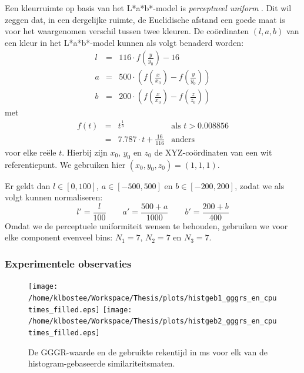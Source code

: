 Een kleurruimte op basis van het L*a*b*-model is \emph{perceptueel uniform} \cite{sharma:digital_color_imaging}. Dit wil zeggen
dat, in een dergelijke ruimte, de Euclidische afstand een goede maat is voor het waargenomen
verschil tussen twee kleuren. De co\"ordinaten $(l,a,b)$ van een kleur in het L*a*b*-model
kunnen als volgt benaderd worden:
$$
\begin{array}{rcl}
l & = & 116 \cdot f(\frac{y}{y_0}) - 16 \\[5pt]
a & = & 500 \cdot \left(f(\frac{x}{x_0}) - f(\frac{y}{y_0})\right) \\[5pt]
b & = & 200 \cdot \left(f(\frac{x}{x_0}) - f(\frac{z}{z_0})\right)
\end{array}
$$ 
met 
$$
\begin{array}{rcll}
f(t) & = & t^\frac{1}{3} & \textrm{als } t > 0.008856 \\
	 & = & 7.787 \cdot t + \frac{16}{116} & \textrm{anders}
\end{array}
$$
voor elke re\"ele $t$.
Hierbij zijn $x_0$, $y_0$ en $z_0$ de XYZ-co\"ordinaten van een wit referentiepunt. We gebruiken
hier $(x_0,y_0,z_0)=(1,1,1)$. 

Er geldt dan $l \in [0,100]$, $a \in [-500,500]$ en $b \in [-200,200]$,
zodat we als volgt kunnen normaliseren:
$$
l' = \frac{l}{100} \qquad
a' = \frac{500 + a}{1000} \qquad
b' = \frac{200 + b}{400}
$$
Omdat we de perceptuele uniformiteit wensen te behouden, gebruiken we voor elke component evenveel bins: 
$N_1=7$, $N_2=7$ en $N_3=7$.


\subsubsection{Experimentele observaties}


\begin{figure}[tbp]
\begin{center}
\texttt{[image: /home/klbostee/Workspace/Thesis/plots/histgeb1\_gggrs\_en\_cputimes\_filled.eps]}
\texttt{[image: /home/klbostee/Workspace/Thesis/plots/histgeb2\_gggrs\_en\_cputimes\_filled.eps]}
\caption{\label{fig:histgeb_gggrs_en_cputimes}De GGGR-waarde en de gebruikte rekentijd in ms voor elk van de histogram-gebaseerde similariteitsmaten.}
\end{center}
\end{figure}

